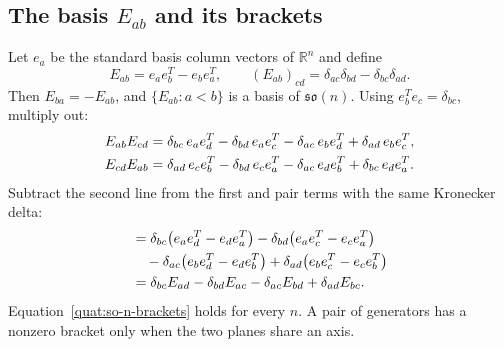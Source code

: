 \subsection{The basis \texorpdfstring{$E_{ab}$}{E\_ab} and its brackets}
Let $e_a$ be the standard basis column vectors of $\mathbb R^n$ and define
\begin{equation}\label{quat:Eab}
 E_{ab}=e_ae_b^T-e_be_a^T,\qquad
 (E_{ab})_{cd}=\delta_{ac}\delta_{bd}-\delta_{bc}\delta_{ad}.
\end{equation}
Then $E_{ba}=-E_{ab}$, and $\{E_{ab}:a<b\}$ is a basis of
$\mathfrak{so}(n)$. Using $e_b^Te_c=\delta_{bc}$, multiply out:
\begin{align}
 E_{ab}E_{cd}&=\delta_{bc}\,e_ae_d^T-\delta_{bd}\,e_ae_c^T
              -\delta_{ac}\,e_be_d^T+\delta_{ad}\,e_be_c^T,\notag\\
 E_{cd}E_{ab}&=\delta_{ad}\,e_ce_b^T-\delta_{bd}\,e_ce_a^T
              -\delta_{ac}\,e_de_b^T+\delta_{bc}\,e_de_a^T .\notag
\end{align}
Subtract the second line from the first and pair terms with the same
Kronecker delta:
\begin{align}
 [E_{ab},E_{cd}]
 &=\delta_{bc}\bigl(e_ae_d^T-e_de_a^T\bigr)
  -\delta_{bd}\bigl(e_ae_c^T-e_ce_a^T\bigr)\notag\\
 &\quad-\delta_{ac}\bigl(e_be_d^T-e_de_b^T\bigr)
  +\delta_{ad}\bigl(e_be_c^T-e_ce_b^T\bigr)\notag\\
 &=\delta_{bc}E_{ad}-\delta_{bd}E_{ac}-\delta_{ac}E_{bd}+\delta_{ad}E_{bc}.
 \label{quat:so-n-brackets}
\end{align}
Equation~\eqref{quat:so-n-brackets} holds for every $n$. A pair of
generators has a nonzero bracket only when the two planes share an axis.

